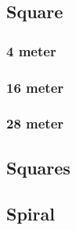 \subsection{Square}
\subsubsection{4 meter}
\subsubsection{16 meter}
\subsubsection{28 meter}
\subsection{Squares}
\subsection{Spiral}
